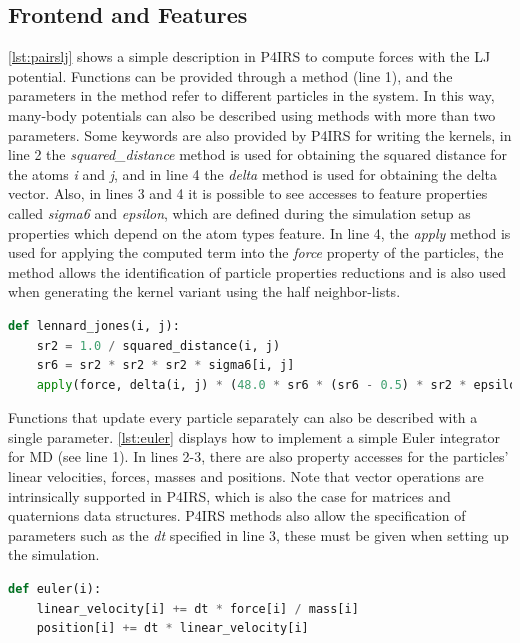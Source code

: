 \documentclass[preprint,12pt]{elsarticle}
\begin{document}
\subsection{Frontend and Features}
\label{sec:frontend}

\autoref{lst:pairslj} shows a simple description in P4IRS to compute forces with the \ac{LJ} potential.
Functions can be provided through a method (line 1), and the parameters in the method refer to different particles in the system.
In this way, many-body potentials can also be described using methods with more than two parameters.
Some keywords are also provided by P4IRS for writing the kernels, in line 2 the \emph{squared\_distance} method is used for obtaining the squared distance for the atoms \emph{i} and \emph{j}, and in line 4 the \emph{delta} method is used for obtaining the delta vector.
Also, in lines 3 and 4 it is possible to see accesses to feature properties called \emph{sigma6} and \emph{epsilon}, which are defined during the simulation setup as properties which depend on the atom types feature.
In line 4, the \emph{apply} method is used for applying the computed term into the \emph{force} property of the particles, the method allows the identification of particle properties reductions and is also used when generating the kernel variant using the half neighbor-lists.

\begin{lstlisting}[language=Python,
		   label={lst:pairslj},
		   caption={Lennard-Jones force description in P4IRS.}]
def lennard_jones(i, j):
    sr2 = 1.0 / squared_distance(i, j)
    sr6 = sr2 * sr2 * sr2 * sigma6[i, j]
    apply(force, delta(i, j) * (48.0 * sr6 * (sr6 - 0.5) * sr2 * epsilon[i, j]))
\end{lstlisting}

Functions that update every particle separately can also be described with a single parameter.
\autoref{lst:euler} displays how to implement a simple Euler integrator for \ac{MD} (see line 1).
In lines 2-3, there are also property accesses for the particles' linear velocities, forces, masses and positions.
Note that vector operations are intrinsically supported in P4IRS, which is also the case for matrices and quaternions data structures.
P4IRS methods also allow the specification of parameters such as the \emph{dt} specified in line 3, these must be given when setting up the simulation.

\begin{lstlisting}[language=Python,
		   label={lst:euler},
		   caption={Euler integrator description in P4IRS.}]
def euler(i):
    linear_velocity[i] += dt * force[i] / mass[i]
    position[i] += dt * linear_velocity[i]
\end{lstlisting}
\end{document}
